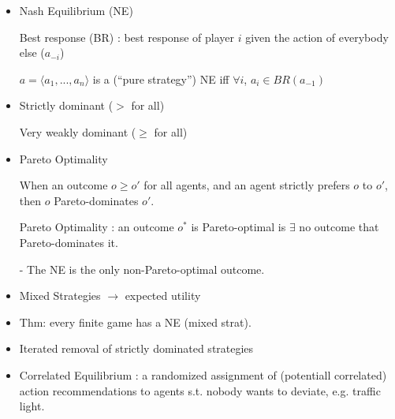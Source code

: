 \documentclass{article}
\begin{document}
\newcommand\independent{\protect\mathpalette{\protect\independenT}{\perp}}
\def\independenT#1#2{\mathrel{\rlap{$#1#2$}\mkern2mu{#1#2}}}


\begin{itemize}
	\item Nash Equilibrium (NE)

	Best response (BR) : best response of player $i$ given the action of everybody else ($a_{-i}$)

	$a = \langle a_1, ..., a_n \rangle$ is a (``pure strategy'') NE iff $\forall i$, $a_i \in BR(a_{-1})$

	\item Strictly dominant ($>$ for all)

	Very weakly dominant ($\geq$ for all)

	\item Pareto Optimality

	When an outcome $o \geq o'$ for all agents, and an agent strictly prefers $o$ to $o'$, then $o$ Pareto-dominates $o'$.

	Pareto Optimality : an outcome $o^*$ is Pareto-optimal is $\exists$ no outcome that Pareto-dominates it.

	- The NE is the only non-Pareto-optimal outcome.


	\item Mixed Strategies $\rightarrow$ expected utility

	\item Thm: every finite game has a NE (mixed strat).

	\item Iterated removal of strictly dominated strategies
	\item Correlated Equilibrium : a randomized assignment of (potentiall correlated) action recommendations to agents s.t. nobody wants to deviate, e.g. traffic light.
\end{itemize}
\end{document}
